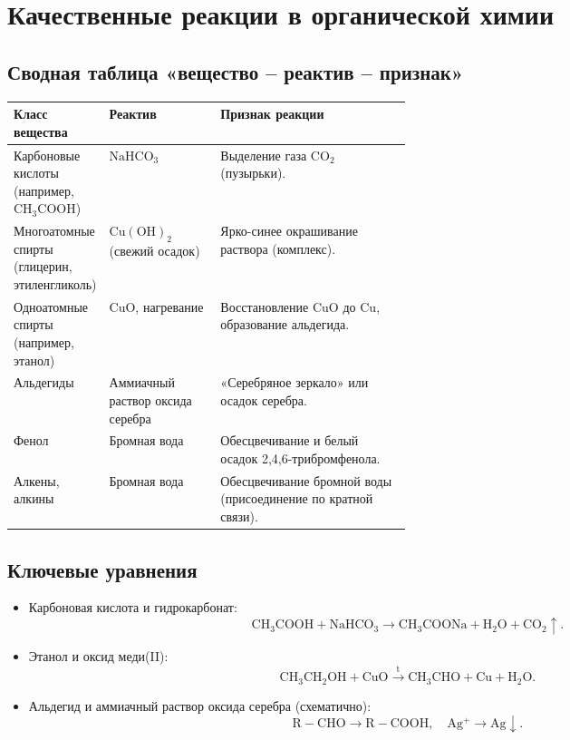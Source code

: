 \documentclass[a4paper,12pt]{article}
\begin{document}
\section{Качественные реакции в органической химии}

\subsection{Сводная таблица «вещество -- реактив -- признак»}
\begin{tabularx}{\linewidth}{>{\raggedright\arraybackslash}p{0.23\linewidth} >{\raggedright\arraybackslash}p{0.28\linewidth} X}
\toprule
\textbf{Класс вещества} & \textbf{Реактив} & \textbf{Признак реакции} \\
\midrule
Карбоновые кислоты (например, \(\mathrm{CH_3COOH}\)) & \(\mathrm{NaHCO_3}\) & Выделение газа \(\mathrm{CO_2}\) (пузырьки). \\
Многоатомные спирты (глицерин, этиленгликоль) & \(\mathrm{Cu(OH)_2}\) (свежий осадок) & Ярко-синее окрашивание раствора (комплекс). \\
Одноатомные спирты (например, этанол) & \(\mathrm{CuO}\), нагревание & Восстановление \(\mathrm{CuO}\) до \(\mathrm{Cu}\), образование альдегида. \\
Альдегиды & Аммиачный раствор оксида серебра & «Серебряное зеркало» или осадок серебра. \\
Фенол & Бромная вода & Обесцвечивание и белый осадок 2,4,6-трибромфенола. \\
Алкены, алкины & Бромная вода & Обесцвечивание бромной воды (присоединение по кратной связи). \\
\bottomrule
\end{tabularx}

\subsection{Ключевые уравнения}
\begin{itemize}
    \item Карбоновая кислота и гидрокарбонат:
    \[
    \mathrm{CH_3COOH + NaHCO_3 \rightarrow CH_3COONa + H_2O + CO_2\uparrow}.
    \]
    \item Этанол и оксид меди(II):
    \[
    \mathrm{CH_3CH_2OH + CuO \xrightarrow{t} CH_3CHO + Cu + H_2O}.
    \]
    \item Альдегид и аммиачный раствор оксида серебра (схематично):
    \[
    \mathrm{R{-}CHO \rightarrow R{-}COOH}, \quad \mathrm{Ag^+ \rightarrow Ag\downarrow}.
    \]
\end{itemize}
\end{document}
